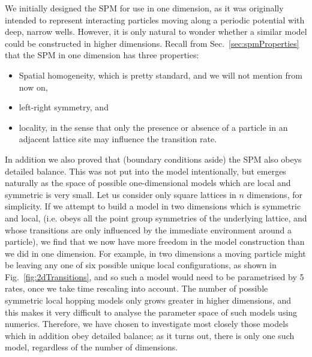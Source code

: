 We initially designed the SPM for use in one dimension, as it was originally intended to represent interacting particles moving along a periodic potential with deep, narrow wells. However, it is only natural to wonder whether a similar
model could be constructed in higher dimensions. Recall from Sec.~\ref{sec:spmProperties}
that the SPM in one dimension has three properties:
\begin{itemize}
 \item Spatial homogeneity, which is pretty standard, and we will not mention from now on,
 \item left-right symmetry, and
 \item locality, in the sense that only the presence or absence of a particle in an adjacent lattice site may influence the transition rate.
\end{itemize}
In addition we also proved that (boundary conditions aside) the SPM also obeys detailed balance. This was not put into the model intentionally, but emerges naturally as the space of possible one-dimensional
models which are local and symmetric is very small.
Let us consider only square lattices in $n$ dimensions, for simplicity. If we attempt to build a model in two dimensions which is symmetric and local, (i.e. obeys all the point group symmetries of the underlying lattice, and whose transitions
are only influenced by the immediate environment around a particle), we find that we now have more freedom in the model construction than we did in one dimension. For example, in two dimensions a moving particle might be leaving
any one of six possible unique local configurations, as shown in Fig.~\ref{fig:2dTransitions}, and so such a model would need to be parametrised by 5 rates, once we take time rescaling
into account. The number of possible
symmetric local hopping models only grows greater in higher dimensions, and this makes it very difficult to analyse the parameter space of such models using numerics. Therefore, we have chosen to investigate most closely those models
which in addition obey detailed balance; as it turns out, there is only one such model, regardless of the number of dimensions.
